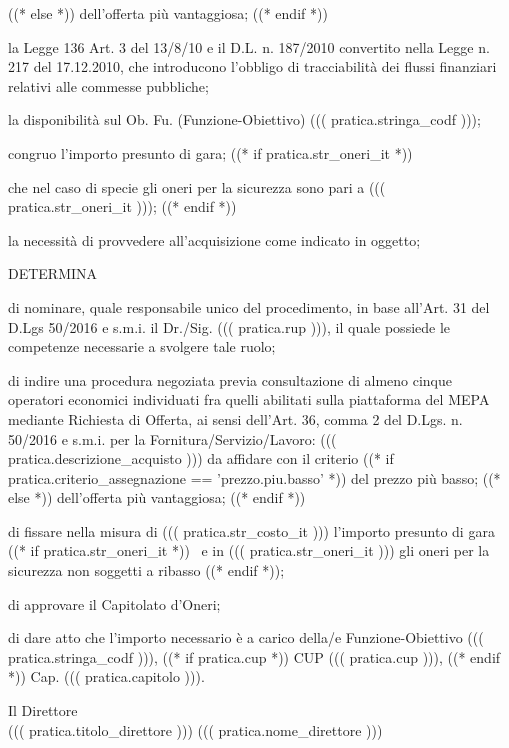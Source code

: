 \documentclass[a4paper,12pt]{letter}
\begin{document}
\begin{list}{VALUTATA}{}
   ((* else *)) %
dell'offerta pi\`u vantaggiosa;
   ((* endif *))
\item[VISTA] la Legge 136 Art. 3 del 13/8/10 e il D.L. n. 187/2010 convertito nella Legge 
        n. 217 del 17.12.2010, che introducono l'obbligo di tracciabilit\`a dei flussi 
        finanziari relativi alle commesse pubbliche; 
\item[VISTA] la disponibilit\`a sul Ob. Fu. (Funzione-Obiettivo) ((( pratica.stringa_codf ))); 
\item[VALUTATO] congruo l'importo presunto di gara;
((* if pratica.str_oneri_it *))
\item[RILEVATO] che nel caso di specie gli oneri per la sicurezza sono pari a ((( pratica.str_oneri_it )));
((* endif *))
\item[VALUTATA] la necessit\`a di provvedere all'acquisizione come indicato in oggetto;
\end{list}



\begin{center}
DETERMINA
\end{center}

\begin{list}{VALUTATA}{}
\item[Art.~1:] di nominare, quale responsabile unico del procedimento, in base 
           all'Art. 31 del D.Lgs 50/2016 e s.m.i. il Dr./Sig. ((( pratica.rup ))),
           il quale possiede le competenze necessarie a svolgere tale ruolo; 
\item[Art.~2:] di indire una procedura negoziata previa consultazione di almeno cinque operatori
           economici individuati fra quelli abilitati
	   sulla piattaforma del MEPA mediante
           Richiesta di Offerta, ai sensi dell'Art. 36, comma 2 del D.Lgs. n. 50/2016 e s.m.i.
           per la Fornitura/Servizio/Lavoro: ((( pratica.descrizione_acquisto ))) da affidare con
           il criterio %
   ((* if pratica.criterio_assegnazione == 'prezzo.piu.basso' *)) %
del prezzo pi\`u basso;
   ((* else *)) %
dell'offerta pi\`u vantaggiosa;
   ((* endif *))

\item[Art.~3:] di fissare nella misura di ((( pratica.str_costo_it ))) l'importo presunto di gara%
((* if pratica.str_oneri_it *))%
  ~e in ((( pratica.str_oneri_it ))) gli oneri per la sicurezza non soggetti a ribasso%
((* endif *));

\item[Art.~4:] di approvare il Capitolato d'Oneri;

\item[Art.~5:] di dare atto che l'importo necessario \`e a carico della/e Funzione-Obiettivo ((( pratica.stringa_codf ))), ((* if pratica.cup *)) CUP ((( pratica.cup ))), ((* endif *)) Cap. ((( pratica.capitolo ))).
\end{list}

\vspace{0.5cm}

\begin{flushright}
\begin{minipage}[t]{6cm}
\begin{center}
Il Direttore \\
((( pratica.titolo_direttore ))) ((( pratica.nome_direttore )))
\end{center}
\end{minipage}
\end{flushright}
\end{document}
